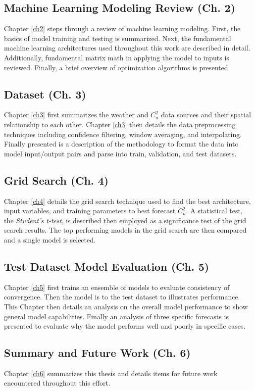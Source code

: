 \subsection{Machine Learning Modeling Review (Ch. 2)}
Chapter \ref{ch2} steps through a review of machine learning modeling. First, the basics of model training and testing is summarized. Next, the fundamental machine learning architectures used throughout this work are described in detail. Additionally, fundamental matrix math in applying the model to inputs is reviewed.  Finally, a brief overview of optimization algorithms is presented.

\subsection{Dataset (Ch. 3)}
Chapter \ref{ch3} first summarizes the weather and $C_{n}^{2}$ data sources and their spatial relationship to each other. Chapter \ref{ch3} then details the data preprocessing techniques including confidence filtering, window averaging, and interpolating. Finally presented is a description of the methodology to format the data into model input/output pairs and parse into train, validation, and test datasets.

\subsection{Grid Search (Ch. 4)}
Chapter \ref{ch4} details the grid search technique used to find the best architecture, input variables, and training parameters to best forecast $C_{n}^{2}$. A statistical test, the \textit{Student's t-test}, is described then employed as a significance test of the grid search results. The top performing models in the grid search are then compared and a single model is selected.

\subsection{Test Dataset Model Evaluation (Ch. 5)}
Chapter \ref{ch5} first trains an ensemble of models to evaluate consistency of convergence. Then the model is to the test dataset to illustrates performance. This Chapter then details an analysis on the overall model performance to show general model capabilities. Finally an analysis of three specific forecasts is presented to evaluate why the model performs well and poorly in specific cases.

\subsection{Summary and Future Work (Ch. 6)}
Chapter \ref{ch6} summarizes this thesis and details items for future work encountered throughout this effort.